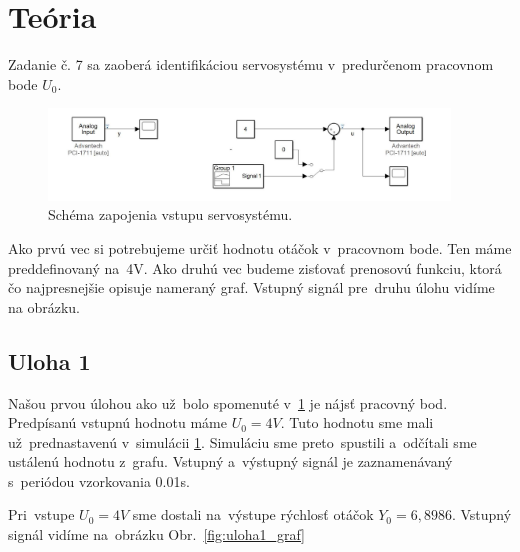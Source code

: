 \documentclass{article}
\begin{document}
\clearpage

\section{Teória}
\label{sec:teoria}

Zadanie č. 7 sa zaoberá identifikáciou servosystému v~predurčenom pracovnom bode $U_0$.

\begin{figure}[!htbp]
	\begin{center}
		\includegraphics[width=0.95\textwidth]{include/schema.png}
	\end{center}
	\caption{Schéma zapojenia vstupu servosystému.}
	\label{fig:schema}
\end{figure}

Ako prvú vec si potrebujeme určiť hodnotu otáčok v~pracovnom bode. Ten máme preddefinovaný na~4V. Ako druhú vec budeme
zisťovať prenosovú funkciu, ktorá čo najpresnejšie opisuje nameraný graf. Vstupný signál pre~druhu úlohu vidíme na
obrázku.

\clearpage

\subsection{Uloha 1}
\label{subsec:u1}

Našou prvou úlohou ako už~bolo spomenuté v~\ref{sec:teoria} je nájsť pracovný bod. Predpísanú vstupnú hodnotu máme
$U_0 = 4V$. Tuto hodnotu sme mali už~prednastavenú v~simulácii \ref{fig:schema}. Simuláciu sme preto~spustili
a~odčítali sme ustálenú hodnotu z~grafu. Vstupný a~výstupný signál je zaznamenávaný s~periódou vzorkovania 0.01s.

Pri~vstupe $U_0 = 4V$ sme dostali na~výstupe rýchlosť otáčok $Y_0 = 6,8986$. Vstupný signál vidíme na~obrázku
Obr.~\ref{fig:uloha1_graf}
\end{document}
